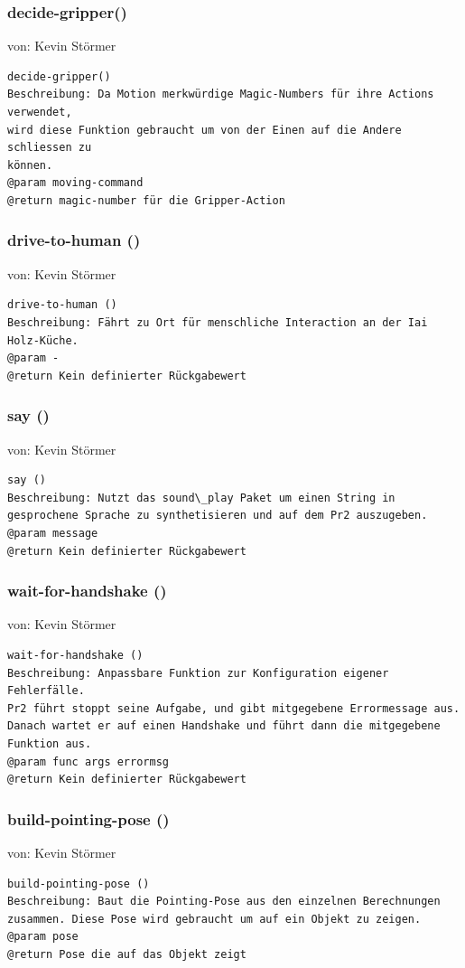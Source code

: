 \documentclass{suturo}
\makeatletter
\newcommand{\chapterauthor}[1]{%
  {\parindent0pt\vspace*{-27pt}%
  \linespread{0}\small\begin{flushright}von: #1\end{flushright}%
  \par\nobreak\vspace*{0pt}}
  \@afterheading%
}
\makeatother
\begin{document}
\subsubsection{decide-gripper()}
\chapterauthor{Kevin Störmer}
\begin{verbatim}
decide-gripper()
Beschreibung: Da Motion merkwürdige Magic-Numbers für ihre Actions verwendet, 
wird diese Funktion gebraucht um von der Einen auf die Andere schliessen zu 
können.
@param moving-command
@return magic-number für die Gripper-Action
\end{verbatim}

\subsubsection{drive-to-human ()}
\chapterauthor{Kevin Störmer}
\begin{verbatim}
drive-to-human ()
Beschreibung: Fährt zu Ort für menschliche Interaction an der Iai Holz-Küche.
@param -
@return Kein definierter Rückgabewert
\end{verbatim}

\subsubsection{say ()}
\chapterauthor{Kevin Störmer}
\begin{verbatim}
say ()
Beschreibung: Nutzt das sound\_play Paket um einen String in 
gesprochene Sprache zu synthetisieren und auf dem Pr2 auszugeben.
@param message
@return Kein definierter Rückgabewert
\end{verbatim}

\subsubsection{wait-for-handshake ()}
\chapterauthor{Kevin Störmer}
\begin{verbatim}
wait-for-handshake ()
Beschreibung: Anpassbare Funktion zur Konfiguration eigener Fehlerfälle. 
Pr2 führt stoppt seine Aufgabe, und gibt mitgegebene Errormessage aus. 
Danach wartet er auf einen Handshake und führt dann die mitgegebene 
Funktion aus.
@param func args errormsg
@return Kein definierter Rückgabewert
\end{verbatim}

\subsubsection{build-pointing-pose ()}
\chapterauthor{Kevin Störmer}
\begin{verbatim}
build-pointing-pose ()
Beschreibung: Baut die Pointing-Pose aus den einzelnen Berechnungen 
zusammen. Diese Pose wird gebraucht um auf ein Objekt zu zeigen.
@param pose
@return Pose die auf das Objekt zeigt
\end{verbatim}
\end{document}
